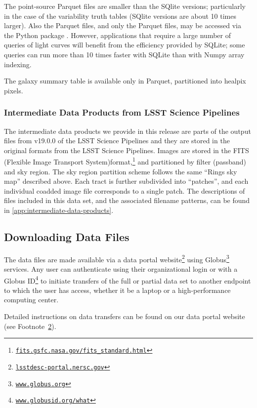\documentclass[modern]{descnote}
\newcommand*{\https}[1]{\href{https://#1}{\nolinkurl{#1}}}
\begin{document}
The point-source Parquet files are smaller than the SQlite versions; particularly in the case of the variability truth tables (SQlite versions are about 10 times larger).  Also the Parquet files, and only the Parquet files, may be accessed via the Python package . However, applications that require a large number of queries of light curves will benefit from the efficiency provided by SQLite; some queries can run more than 10 times faster with SQLite than with Numpy array indexing. 

The galaxy summary table is available only in Parquet, partitioned into healpix pixels.  

\subsubsection{Intermediate Data Products from LSST Science Pipelines}
\label{sec:representation-intermediate}


The intermediate data products we provide in this release are parts of the output files from v19.0.0 of the LSST Science Pipelines and they are stored in the original formats from the LSST Science Pipelines. Images are stored in the FITS (Flexible Image Transport System)format,\footnote{\https{fits.gsfc.nasa.gov/fits_standard.html}} and partitioned by filter (passband) and sky region. The sky region partition scheme follows the same ``Rings sky map'' described above. Each tract is further subdivided into ``patches'', and each individual coadded image file corresponds to a single patch. The descriptions of files included in this data set, and the associated filename patterns, can be found in \autoref{app:intermediate-data-products}. 


\subsection{Downloading Data Files}
\label{sec:download}

The data files are made available via a data portal website\footnote{\https{lsstdesc-portal.nersc.gov}\label{fn:portal}} using Globus\footnote{\https{www.globus.org}} services. Any user can authenticate using their organizational login or with a Globus ID\footnote{\https{www.globusid.org/what}} to initiate transfers of the full or partial data set to another endpoint to which the user has access, whether it be a laptop or a high-performance computing center. 

Detailed instructions on data transfers can be found on our data portal website (see Footnote~\ref{fn:portal}).
\end{document}
